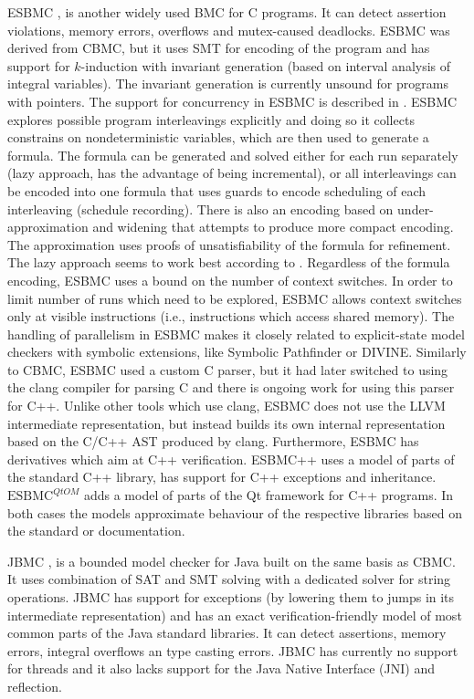 ESBMC , is another widely used BMC for C
programs.
It can detect assertion violations, memory errors, overflows and mutex-caused
deadlocks.
ESBMC was derived from CBMC, but it uses SMT for encoding of the program and has
support for $k$-induction with invariant generation (based on interval analysis
of integral variables).
The invariant generation is currently unsound for programs with pointers.
The support for concurrency in ESBMC is described in .
ESBMC explores possible program interleavings explicitly and
doing so it collects constrains on nondeterministic variables, which are then
used to generate a formula.
The formula can be generated and solved either for each run separately (lazy
approach, has the advantage of being incremental), or all interleavings can be
encoded into one formula that uses guards to encode scheduling of each
interleaving (schedule recording).
There is also an encoding based on under-approximation and widening that
attempts to produce more compact encoding.
The approximation uses proofs of unsatisfiability of the formula for refinement.
The lazy approach seems to work best according to .
Regardless of the formula encoding, ESBMC uses a bound on the number of context
switches.
In order to limit number of runs which need to be explored, ESBMC allows
context switches only at visible instructions (i.e., instructions which access
shared memory).
The handling of parallelism in ESBMC makes it closely related to explicit-state
model checkers with symbolic extensions, like Symbolic Pathfinder or DIVINE.
Similarly to CBMC, ESBMC used a custom C parser, but it had later switched to
using the clang compiler for parsing C and there is ongoing work for using this
parser for C++.
Unlike other tools which use clang, ESBMC does not use the LLVM intermediate
representation, but instead builds its own internal representation based on the
C/C++ AST produced by clang.
Furthermore, ESBMC has derivatives which aim at C++ verification.
ESBMC++  uses a model of parts of the standard C++ library,
has support for C++ exceptions and inheritance.
$\text{ESBMC}^{\textit{Qt}OM}$  adds a model
of parts of the Qt framework for C++ programs.
In both cases the models approximate behaviour of the respective libraries
based on the standard or documentation.

JBMC , is a bounded model checker for
Java built on the same basis as CBMC.
It uses combination of SAT and SMT solving with a dedicated solver for string
operations.
JBMC has support for exceptions (by lowering them to jumps in its intermediate
representation) and has an exact verification-friendly model of most common
parts of the Java standard libraries.
It can detect assertions, memory errors, integral overflows an type casting
errors.
JBMC has currently no support for threads and it also lacks support for the
Java Native Interface (JNI) and reflection.

